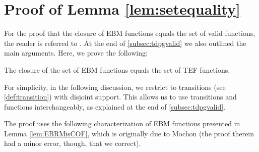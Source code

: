\documentclass{theoretics}
\begin{document}
 
\vspace{3em}
\printbibliography
\appendix



\section{Proof of  Lemma \ref{lem:setequality}\label{sec:TEF-functions=00003DValid-functions=00003DclosureOfEBMfunctions}}

For the proof that the closure of EBM functions equals the set of valid functions, the reader is referred to \cite{ACG+14}. At the end of \cref{subsec:tdpgvalid} we also outlined the main arguments. Here, we prove the following:

\begin{lemma}
The closure of the set of EBM functions equals the set of TEF functions.\label{lem:closureEBMisTEF}
\end{lemma}

For simplicity, in the following discussion, we restrict to transitions (see \cref{def:transition}) with disjoint
support. This allows us to use transitions and functions interchangeably, as explained at the end of \cref{subsec:tdpgvalid}. 

The proof uses the following characterization of EBM functions presented in Lemma \ref{lem:EBRMisCOF}, which is originally due
 to Mochon \cite{Mochon07} (the proof therein had a minor
error, though, that we correct). 
\end{document}
